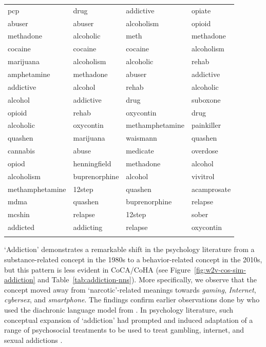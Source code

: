 \documentclass[output=paper]{langsci/langscibook}
\begin{document}
\begin{table}
\begin{tabular}{llll}
pcp&drug&addictive&opiate\\
abuser&abuser&alcoholism&opioid\\
methadone&alcoholic&meth&methadone\\
cocaine&cocaine&cocaine&alcoholism\\
marijuana&alcoholism&alcoholic&rehab\\
amphetamine&methadone&abuser&addictive\\
addictive&alcohol&rehab&alcoholic\\
alcohol&addictive&drug&suboxone\\
opioid&rehab&oxycontin&drug\\
alcoholic&oxycontin&methamphetamine&painkiller\\
quashen&marijuana&waismann&quashen\\
cannabis&abuse&medicate&overdose\\
opiod&henningfield&methadone&alcohol\\
alcoholism&buprenorphine&alcohol&vivitrol\\
methamphetamine&12step&quashen&acamprosate\\
mdma&quashen&buprenorphine&relapse\\
mcshin&relapse&12step&sober\\
addicted&addicting&relapse&oxycontin\\   
\lspbottomrule
\end{tabular}
\end{table}


`Addiction' demonstrates a remarkable shift in the psychology literature from a substance-related concept in the 1980s to a behavior-related concept in the 2010s, but this pattern is less evident in CoCA/CoHA (see Figure~\ref{fig:w2v-cos-sim-addiction} and Table~\ref{tab:addiction-nns}).
More specifically, we observe that the concept moved away from  `narcotic'-related meanings towards \textit{gaming}, \textit{Internet}, \textit{cybersex}, and \textit{smartphone}.  
The findings confirm earlier observations done by \citet{vylomova-etal-2019-evaluation} who used the diachronic language model from \citet{hamilton-etal-2016-diachronic}.
In psychology literature, such conceptual expansion of `addiction' had prompted and induced adaptation of a range of psychosocial treatments to be used to treat gambling, internet, and sexual addictions \citep{yau2015gambling}.
\end{document}
